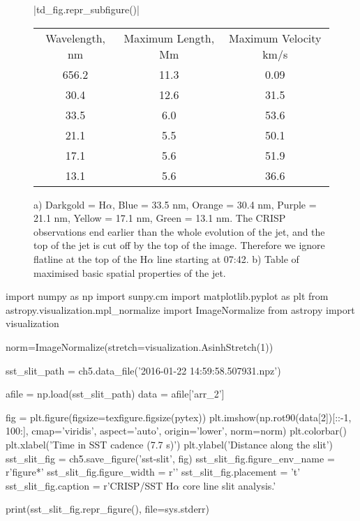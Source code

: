 \begin{figure}[t]
	\centering
	\py[chapter5]|td_fig.repr_subfigure()|
	
	\begin{subtable}[b]{0.5\textwidth}
		\centering
		\begin{tabular}{ccc}
		Wavelength, nm & Maximum Length, Mm & Maximum Velocity km/s \\
		656.2 & 11.3 & 0.09 \\
		30.4 & 12.6 & 31.5 \\
		33.5 & 6.0 & 53.6 \\
		21.1 & 5.5 & 50.1 \\
		17.1 & 5.6 & 51.9 \\
		13.1 & 5.6 & 36.6 \\
		\end{tabular}
		\caption{}
	\end{subtable}
	\caption{a) Darkgold = H$\alpha$, Blue = 33.5 nm, Orange = 30.4 nm, Purple = 21.1 nm, Yellow = 17.1 nm, Green = 13.1 nm. The CRISP observations end earlier than the whole evolution of the jet, and the top of the jet is cut off by the top of the image. Therefore we ignore flatline at the top of the H$\alpha$ line starting at 07:42. b) Table of maximised basic spatial properties of the jet.}
\end{figure}


\begin{pycode}[chapter5]
import numpy as np
import sunpy.cm
import matplotlib.pyplot as plt
from astropy.visualization.mpl_normalize import ImageNormalize 
from astropy import visualization

norm=ImageNormalize(stretch=visualization.AsinhStretch(1))

sst_slit_path = ch5.data_file('2016-01-22 14:59:58.507931.npz')

afile = np.load(sst_slit_path)
data = afile['arr_2']

fig = plt.figure(figsize=texfigure.figsize(pytex))
plt.imshow(np.rot90(data[2])[::-1, 100:], cmap='viridis', aspect='auto', origin='lower', norm=norm)
plt.colorbar()
plt.xlabel('Time in SST cadence (7.7 s)')
plt.ylabel('Distance along the slit')
sst_slit_fig = ch5.save_figure('sst-slit', fig)
sst_slit_fig.figure_env_name = r'figure*'
sst_slit_fig.figure_width = r'\columnwidth'
sst_slit_fig.placement = 't'
sst_slit_fig.caption = r'CRISP/SST H$\alpha$ core line slit analysis.'

print(sst_slit_fig.repr_figure(), file=sys.stderr)
\end{pycode}

